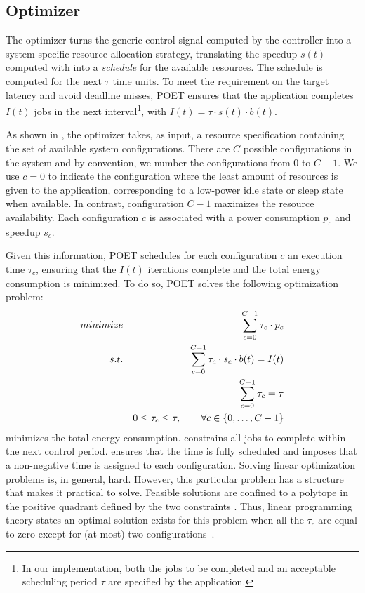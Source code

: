 \subsection{Optimizer}
\label{sec:poet-optimizer}

The optimizer turns the generic control signal computed by the controller into a system-specific resource allocation strategy, translating the speedup $s(t)$ computed with  into a \emph{schedule} for the available resources.
The schedule is computed for the next $\tau$ time units.
To meet the requirement on the target latency and avoid deadline misses, POET ensures that the application completes $I(t)$ jobs in the next interval\footnote{In our implementation, both the jobs to be completed and an acceptable scheduling period $\tau$ are specified by the application.}, with $I(t) = \tau \cdot s(t) \cdot b(t)$.

As shown in , the optimizer takes, as input, a resource specification containing the set of available system configurations.
There are $C$ possible configurations in the system and by convention, we number the configurations from $0$ to $C-1$.
We use $c = 0$ to indicate the configuration where the least amount of resources is given to the application, corresponding to a low-power idle state or sleep state when available.
In contrast, configuration $C-1$ maximizes the resource availability.
Each configuration $c$ is associated with a power consumption $p_c$ and speedup $s_c$.

Given this information, POET schedules for each configuration $c$ an execution time $\tau_c$, ensuring that the $I(t)$ iterations complete and the total energy consumption is minimized. To do so, POET solves the following optimization problem:
\begin{eqnarray}
\minimize && \sum_{c=0}^{C-1} \tau_c \cdot p_c \label{eqn:poet-power} \\
\st %
&& \sum_{c=0}^{C-1} \tau_c \cdot s_c \cdot b(t) =  I(t) \label{eqn:poet-work} \\
&& \sum_{c=0}^{C-1} \tau_c =  \tau \label{eqn:poet-deadline} \\
&& 0 \le \tau_c \le \tau, \qquad \forall c \in \{0,\ldots,C-1\} \label{eqn:poet-time}
\end{eqnarray}
 minimizes the total energy consumption.
 constrains all jobs to complete within the next control period.
 ensures that the time is fully scheduled and  imposes that a non-negative time is assigned to each configuration.
Solving linear optimization problems is, in general, hard.
However, this particular problem has a structure that makes it practical to solve.
Feasible solutions are confined to a polytope in the positive quadrant defined by the two constraints .
Thus, linear programming theory states an optimal solution exists for this problem when all the $\tau_c$ are equal to zero except for (at most) two configurations~\cite{LP}.

